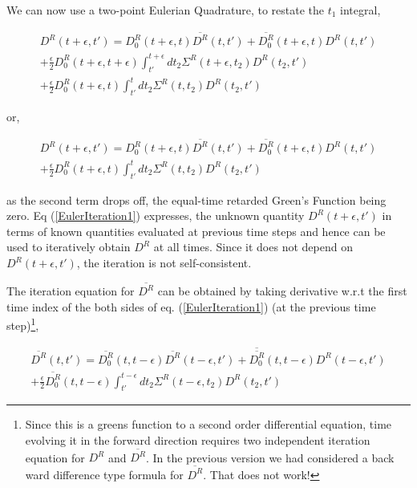 \documentclass{amsart}
\begin{document}
    We can now use a two-point Eulerian Quadrature, to restate the $t_1$ integral,
    
    \begin{multline}\label{Euler}
        D^R(t+\epsilon , t') = D_0^R(t+\epsilon , t)\overline{D^R}(t , t')+\overline{D^R_0}(t+\epsilon , t)D^R(t , t')
        \\ + \frac{\epsilon}{2} D_0^R(t+\epsilon, t+\epsilon)\int^{t+\epsilon}_{t'} dt_2 \Sigma^R (t+\epsilon,t_2) D^R(t_2, t')
        \\ + \frac{\epsilon}{2} D_0^R(t+\epsilon, t)\int^{t}_{t'} dt_2 \Sigma^R (t,t_2) D^R(t_2, t')
    \end{multline}
    
    or,
    
    \begin{multline}\label{EulerIteration1}
        D^R(t+\epsilon , t') = D^R_0(t+\epsilon , t) {\overline{D^R}(t , t')}+\overline{D^R_0}(t+\epsilon , t)D^R(t , t')
        \\ + \frac{\epsilon}{2} D_0^R(t+\epsilon, t)\int^{t}_{t'} dt_2 \Sigma^R (t,t_2) D^R(t_2, t')
    \end{multline}
    
    as the second term drops off, the equal-time retarded Green's Function being zero. Eq (\ref{EulerIteration1}) expresses, the unknown quantity $D^R(t+\epsilon , t')$ in terms of known quantities evaluated at previous time steps and hence can be used to iteratively obtain $D^R$ at all times. Since it does not depend on $D^R(t+\epsilon , t')$, the iteration is not self-consistent.  
    
     {The iteration equation for $\overline{D^R}$ can be obtained by taking derivative w.r.t the first time index of the both sides of eq. (\ref{EulerIteration1}) (at the previous time step)\footnote{ {Since this is a greens function to a second order differential equation, time evolving it in the forward direction requires two independent iteration equation for $D^R$ and $\overline{D^R}$. In the previous version we had considered a back ward difference type formula for $\overline{D^R}$. That does not work!}},}
    
    \begin{multline}\label{EulerIteration2}
        \overline{D^R}(t , t') = \overline{D^R_0}(t , t-\epsilon)\overline{D^R}(t-\epsilon , t')+\overline{\overline{D^R_0}}(t , t-\epsilon)D^R(t-\epsilon , t')
         \\  + \frac{\epsilon}{2} \overline{D_0^R}(t, t-\epsilon)\int^{t-\epsilon}_{t'} dt_2 \Sigma^R (t-\epsilon,t_2) D^R(t_2, t')
    \end{multline}
    
\end{document}
